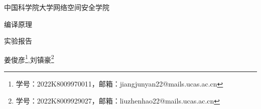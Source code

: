 \documentclass[11pt]{article}
\makeatletter
\newcommand{\Institution}{中国科学院大学网络空间安全学院}
\newcommand{\className}{编译原理}
\newcommand{\documentType}{实验报告}
\newcommand{\studentName}{姜俊彦}
\newcommand{\studentNumber}{2022K8009970011}
\newcommand{\studentEmail}{jiangjunyan22@mails.ucas.ac.cn}
\newcommand{\groupStudentName}{刘镇豪}
\newcommand{\groupStudentNumber}{2022K8009929027}
\newcommand{\groupStudentEmail}{liuzhenhao22@mails.ucas.ac.cn}
\makeatother
\begin{document}
\begin{center}
	\huge \Institution

	\className

	\LARGE \documentType

  \large \kaishu \studentName\footnote{学号：\studentNumber，邮箱：\studentEmail},\groupStudentName\footnote{学号：\groupStudentNumber，邮箱：\groupStudentEmail}
\end{center}

\tableofcontents

\newpage

% 

\end{document}
